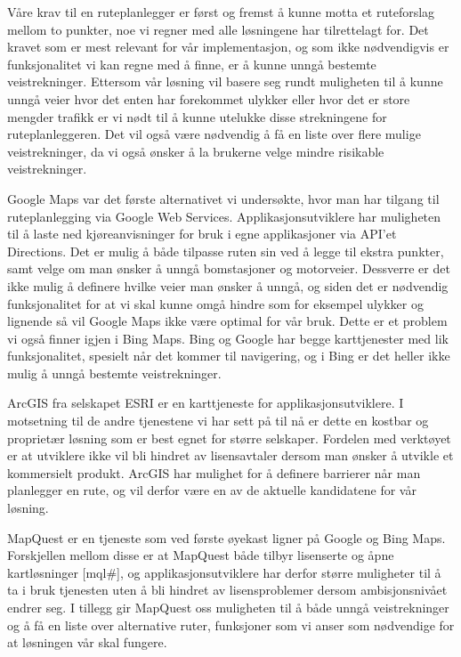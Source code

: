 \documentclass[a4paper,norsk,oneside]{book}
\begin{document}
Våre krav til en ruteplanlegger er først og fremst å kunne motta et ruteforslag mellom to punkter, noe vi regner med alle løsningene har tilrettelagt for. Det kravet som er mest relevant for vår implementasjon, og som ikke nødvendigvis er funksjonalitet vi kan regne med å finne, er å kunne unngå bestemte veistrekninger. Ettersom vår løsning vil basere seg rundt muligheten til å kunne unngå veier hvor det enten har forekommet ulykker eller hvor det er store mengder trafikk er vi nødt til å kunne utelukke disse strekningene for ruteplanleggeren. Det vil også være nødvendig å få en liste over flere mulige veistrekninger, da vi også ønsker å la brukerne velge mindre risikable veistrekninger.
	
Google Maps var det første alternativet vi undersøkte, hvor man har tilgang til ruteplanlegging via Google Web Services. Applikasjonsutviklere har muligheten til å laste ned kjøreanvisninger for bruk i egne applikasjoner via API’et Directions.\cite{directions} Det er mulig å både tilpasse ruten sin ved å legge til ekstra punkter, samt velge om man ønsker å unngå bomstasjoner og motorveier. Dessverre er det ikke mulig å definere hvilke veier man ønsker å unngå, og siden det er nødvendig funksjonalitet for at vi skal kunne omgå hindre som for eksempel ulykker og lignende så vil Google Maps ikke være optimal for vår bruk. Dette er et problem vi også finner igjen i Bing Maps\cite{bing}. Bing og Google har begge karttjenester med lik funksjonalitet, spesielt når det kommer til navigering, og i Bing er det heller ikke mulig å unngå bestemte veistrekninger.
	
ArcGIS fra selskapet ESRI er en karttjeneste for applikasjonsutviklere.\cite{arcgis} I motsetning til de andre tjenestene vi har sett på til nå er dette en kostbar og proprietær løsning som er best egnet for større selskaper. Fordelen med verktøyet er at utviklere ikke vil bli hindret av lisensavtaler dersom man ønsker å utvikle et kommersielt produkt. ArcGIS har mulighet for å definere barrierer når man planlegger en rute, og vil derfor være en av de aktuelle kandidatene for vår løsning.
	
MapQuest er en tjeneste som ved første øyekast ligner på Google og Bing Maps. Forskjellen mellom disse er at MapQuest både tilbyr lisenserte og åpne kartløsninger [mql\#], og applikasjonsutviklere har derfor større muligheter til å ta i bruk tjenesten uten å bli hindret av lisensproblemer dersom ambisjonsnivået endrer seg. I tillegg gir MapQuest oss muligheten til å både unngå veistrekninger og å få en liste over alternative ruter, funksjoner som vi anser som nødvendige for at løsningen vår skal fungere.\cite{altruter} \cite{unnga}
\end{document}
